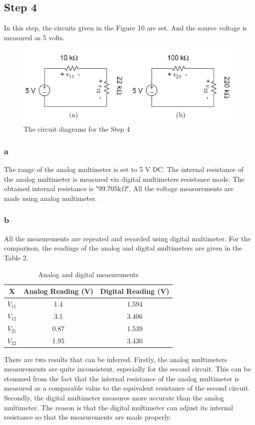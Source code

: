 \documentclass[letterpaper,12pt]{article}
\begin{document}
\subsection{Step 4}
In this step, the circuits given in the Figure 10 are set. And the source voltage is measured as 5 volts. 
\begin{figure}[H]
	\centering
   \includegraphics[width=1\textwidth]{4_sch.png}
   \caption{The circuit diagrams for the Step 4}
\end{figure}  

\subsubsection{a}
The range of the analog multimeter is set to 5 V DC. The internal resistance of the analog multimeter is measured via digital multimeters resistance mode. The obtained internal resistance is "99.705k\(\Omega\)". All the voltage measurements are made using analog multimeter.
\subsubsection{b}
All the measurements are repeated and recorded using digital multimeter. For the comparison, the readings of the analog and digital multimeters are given in the Table 2.
\begin{table}[H]
	\begin{center}
		\caption{Analog and digital measurements}
		\vspace{2mm}
		\begin{tabular}{||c | c | c||} 
		 \hline 
		 X & Analog Reading (V) & Digital Reading (V) \\ [0.5ex] 
		 \hline\hline
		 \(V_{11}\) & 1.4 & 1.594  \\ 
		 \hline
		 \(V_{12}\) & 3.1 & 3.406  \\
		 \hline
		 \(V_{21}\) & 0.87 & 1.539  \\ 
		 \hline
		 \(V_{22}\) & 1.95 & 3.430  \\
		 \hline
		\end{tabular}
	\end{center}
\end{table}
There are two results that can be inferred. Firstly, the analog multimeters measurements are quite inconsistent, especially for the second circuit. This can be stemmed from the fact that the internal resistance of the analog multimeter is measured as a comparable value to the equivalent resistance of the second circuit. Secondly, the digital multimeter measures more accurate than the analog multimeter. The reason is that the digital multimeter can adjust its internal resistance so that the measurements are made properly.  
\end{document}
